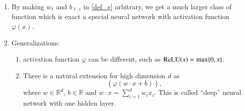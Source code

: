 \begin{remark}
	\begin{enumerate}
		\item By making $w_\ell$ and $b_{\ell,i}$ in \eqref{def_g} arbitrary, we get a much larger class of 
		function which is exact a special neural network with activation function $\varphi(x)$.
		\item Generalizations: 
		\begin{enumerate}
			\item activation function $\varphi$ can be different, such as ${\rm ReLU}(x) = \max\{0,x\}$.
			\item There is a natural extension for high dimension $d$ as
			\begin{equation}\label{key}
			\left\{  \varphi(w\cdot x + b) \right \},
			\end{equation}
			where $w\in \mathbb{R}^d$, $b\in \mathbb{R}$ and $\displaystyle w\cdot x = \sum_{i=1}^d w_i x_i$.
			This is called ``deep'' neural network with one hidden layer.
		\end{enumerate}
	\end{enumerate}
\end{remark}


%
